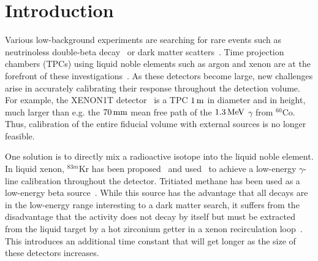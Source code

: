 
\section{Introduction}\label{sec:introduction}

Various low-background experiments are searching for rare events such as neutrinoless double-beta decay~\cite{Pandola:2014naa} or dark matter scatters~\cite{Undagoitia:2015gya}. Time projection chambers (TPCs) using liquid noble elements such as argon and xenon are at the forefront of these investigations~\cite{Albert:2015ekt,Aprile:2013doa,Akerib:2015rjg,Amaudruz:2014nsa,Calvo:2015uln,Agnes:2015ftt}. As these detectors become large, new challenges arise in accurately calibrating their response throughout the detection volume. For example, the XENON1T detector~\cite{Aprile:2015uzo} is a TPC $1\, \mathrm{m}$ in diameter and in height, much larger than e.g. the $70\, \mathrm{mm}$ mean free path of the $1.3\, \mathrm{MeV}$ $\gamma$ from $^{60}$Co. Thus, calibration of the entire fiducial volume with external sources is no longer feasible.

One solution is to directly mix a radioactive isotope into the liquid noble element. In liquid xenon, $^{83m}$Kr has been proposed~\cite{Hannen:2011,Manalaysay:2009yq,Kastens:2010} and used~\cite{Akerib:2013tjd} to achieve a low-energy $\gamma$-line calibration throughout the detector. Tritiated methane has been used as a low-energy beta source~\cite{Akerib:2013tjd}. While this source has the advantage that all decays are in the low-energy range interesting to a dark matter search, it suffers from the disadvantage that the activity does not decay by itself but must be extracted from the liquid target by a hot zirconium getter in a xenon recirculation loop~\cite{Akerib:2015wdi}. This introduces an additional time constant that will get longer as the size of these detectors increases.

